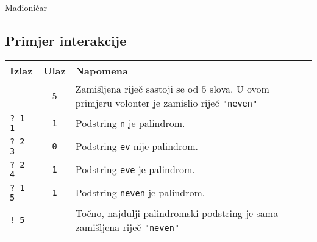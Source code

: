 \begin{statement}[
  problempoints=100,
  timelimit=1 sekunda,
  memorylimit=512 MiB,
]{Mađioničar}
\subsection*{Primjer interakcije}
{\renewcommand{\arraystretch}{1.4}
  \setlength{\tabcolsep}{6pt}
  \begin{tabular}{lcl}
    Izlaz & Ulaz & Napomena \\ \midrule
      & 5 & Zamišljena riječ sastoji se od $5$ slova. U ovom primjeru volonter je zamislio rijeć \texttt{"neven"} \\
    \texttt{\frenchspacing? 1 1} & \texttt{1} & Podstring \texttt{n} je palindrom. \\
    \texttt{\frenchspacing? 2 3} & \texttt{0} & Podstring \texttt{ev} nije palindrom. \\
    \texttt{\frenchspacing? 2 4} & \texttt{1} & Podstring \texttt{eve} je palindrom. \\
    \texttt{\frenchspacing? 1 5} & \texttt{1} & Podstring \texttt{neven} je palindrom. \\
    \texttt{\frenchspacing! 5} & & Točno, najdulji palindromski podstring je sama zamišljena riječ \texttt{"neven"} \\
\end{tabular}}


\end{statement}

